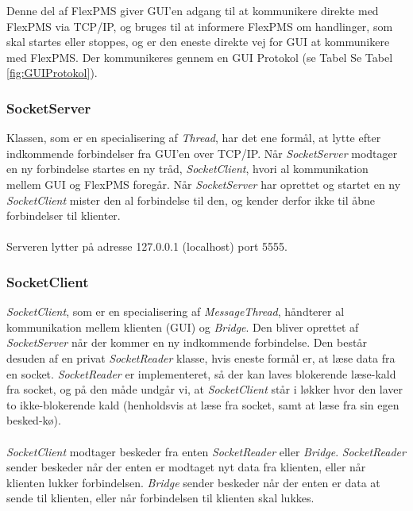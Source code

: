 Denne del af FlexPMS giver GUI'en adgang til at kommunikere direkte med FlexPMS via TCP/IP, og bruges til at informere FlexPMS om handlinger, som skal startes eller stoppes, og er den eneste direkte vej for GUI at kommunikere med FlexPMS. Der kommunikeres gennem en GUI Protokol (se Tabel Se Tabel \ref{fig:GUIProtokol}).




\subsubsection{SocketServer}
Klassen, som er en specialisering af \textit{Thread}, har det ene formål, at lytte efter indkommende forbindelser fra GUI’en over TCP/IP. Når \textit{SocketServer} modtager en ny forbindelse startes en ny tråd, \textit{SocketClient}, hvori al kommunikation mellem GUI og FlexPMS foregår. Når \textit{SocketServer} har oprettet og startet en ny \textit{SocketClient} mister den al forbindelse til den, og kender derfor ikke til åbne forbindelser til klienter.\\\\

Serveren lytter på adresse 127.0.0.1 (localhost) port 5555.



\subsubsection{SocketClient}

\textit{SocketClient}, som er en specialisering af \textit{MessageThread}, håndterer al kommunikation mellem klienten (GUI) og \textit{Bridge}. Den bliver oprettet af \textit{SocketServer} når der kommer en ny indkommende forbindelse. Den består desuden af en privat \textit{SocketReader} klasse, hvis eneste formål er, at læse data fra en socket. \textit{SocketReader} er implementeret, så der kan laves blokerende læse-kald fra socket, og på den måde undgår vi, at \textit{SocketClient} står i løkker hvor den laver to ikke-blokerende kald (henholdsvis at læse fra socket, samt at læse fra sin egen besked-kø).\\\\

\textit{SocketClient} modtager beskeder fra enten \textit{SocketReader} eller \textit{Bridge}. \textit{SocketReader} sender beskeder når der enten er modtaget nyt data fra klienten, eller når klienten lukker forbindelsen. \textit{Bridge} sender beskeder når der enten er data at sende til klienten, eller når forbindelsen til klienten skal lukkes.\\\\

